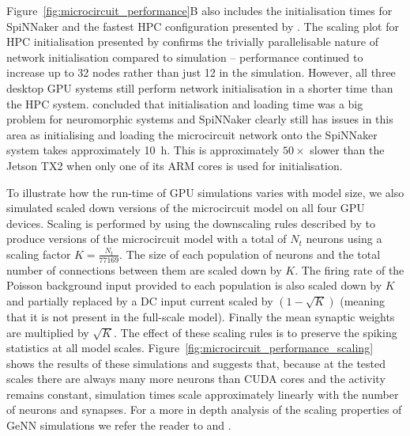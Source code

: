 \documentclass[utf8]{frontiersSCNS} %
\begin{document}
Figure~\ref{fig:microcircuit_performance}B also includes the initialisation times for SpiNNaker and the fastest HPC configuration presented by \citet{VanAlbada2018}.
The scaling plot for HPC initialisation presented by \citeauthor{VanAlbada2018} confirms the trivially parallelisable nature of network initialisation compared to simulation -- performance continued to increase up to 32 nodes rather than just 12 in the simulation.
However, all three desktop GPU systems still perform network initialisation in a shorter time than the HPC system.
\citet{Diamond2018} concluded that initialisation and loading time was a big problem for neuromorphic systems and SpiNNaker clearly still has issues in this area as initialising and loading the microcircuit network onto the SpiNNaker system takes approximately \SI{10}{\hour}.
This is approximately $50\times$ slower than the Jetson TX2 when only one of its ARM cores is used for initialisation.

To illustrate how the run-time of GPU simulations varies with model size, we also simulated scaled down versions of the microcircuit model on all four GPU devices.
Scaling is performed by using the downscaling rules described by \citet{VanAlbada2015} to produce versions of the microcircuit model with a total of $N_t$ neurons using a scaling factor $K = \frac{N_t}{77169}$.
The size of each population of neurons and the total number of connections between them are scaled down by $K$.
The firing rate of the Poisson background input provided to each population is also scaled down by $K$ and partially replaced by a DC input current scaled by $(1 - \sqrt{K})$ (meaning that it is not present in the full-scale model).
Finally the mean synaptic weights are multiplied by $\sqrt{K}$.
The effect of these scaling rules is to preserve the spiking statistics at all model scales.
Figure~\ref{fig:microcircuit_performance_scaling} shows the results of these simulations and suggests that, because at the tested scales there are always many more neurons than CUDA cores and the activity remains constant, simulation times scale approximately linearly with the number of neurons and synapses.
For a more in depth analysis of the scaling properties of GeNN simulations we refer the reader to \citet{Yavuz2016} and \citet{Stimberg2018}.
\end{document}

